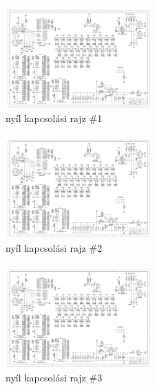 \documentclass[tocnopagenum]{thesis-ekf}
\theoremstyle{definition}
\theoremstyle{remark}
\begin{document}
	\begin{figure}[h]
		\centering
		\includegraphics[page=1,width=0.5\textwidth]{SLN}
		
		\caption{nyíl kapcsolási rajz \#1}
		\label{fig:nyil1}
	\end{figure}
	\begin{figure}[h]
		\centering
		\includegraphics[page=2,width=0.5\textwidth]{SLN}
		
		\caption{nyíl kapcsolási rajz \#2}
		\label{fig:nyil2}
	\end{figure}
	\begin{figure}[h]
		\centering
		\includegraphics[page=3,width=0.5\textwidth]{SLN}
		
		\caption{nyíl kapcsolási rajz \#3}
		\label{fig:nyil3}
	\end{figure}
\end{document}
